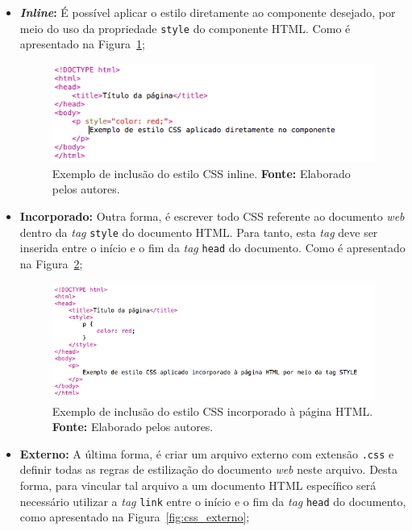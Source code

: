 \begin{itemize}
	\item \textbf{\textit{Inline}:} É possível aplicar o estilo diretamente ao componente desejado, por meio do uso da propriedade \texttt{style} do componente HTML. Como é apresentado na Figura~\ref{fig:css_inline};
	
	\begin{figure}[h!]
		\centerline{\includegraphics[scale=0.8]{./imagens/example_css_inline.png}}
		\caption[Exemplo de inclusão do estilo CSS inline]
		{Exemplo de inclusão do estilo CSS inline. \textbf{Fonte:} Elaborado pelos autores.}
		\label{fig:css_inline}
	\end{figure}
	
	\item \textbf{Incorporado:} Outra forma, é escrever todo CSS referente ao  documento \textit{web} dentro da \textit{tag} \texttt{style} do documento HTML. Para tanto, esta \textit{tag} deve ser inserida entre o início e o fim da \textit{tag} \texttt{head} do documento. Como é apresentado na Figura~\ref{fig:css_incorporado};
	
	\begin{figure}[h!]
		\centerline{\includegraphics[scale=0.65]{./imagens/example_css_incorpored.png}}
		\caption[Exemplo de inclusão do estilo CSS incorporado à página HTML]
		{Exemplo de inclusão do estilo CSS incorporado à página HTML. \textbf{Fonte:} Elaborado pelos autores.}
		\label{fig:css_incorporado}
	\end{figure}
	
	 \newpage
	\item \textbf{Externo:} A última forma, é criar um arquivo externo com extensão \texttt{.css} e definir todas as regras de estilização do documento \textit{web} neste arquivo. Desta forma, para vincular tal arquivo a um documento HTML específico será necessário utilizar a \textit{tag} \texttt{link} entre o início e o fim da \textit{tag} \texttt{head} do documento, como apresentado na Figura~\ref{fig:css_externo};
	

\end{itemize}
